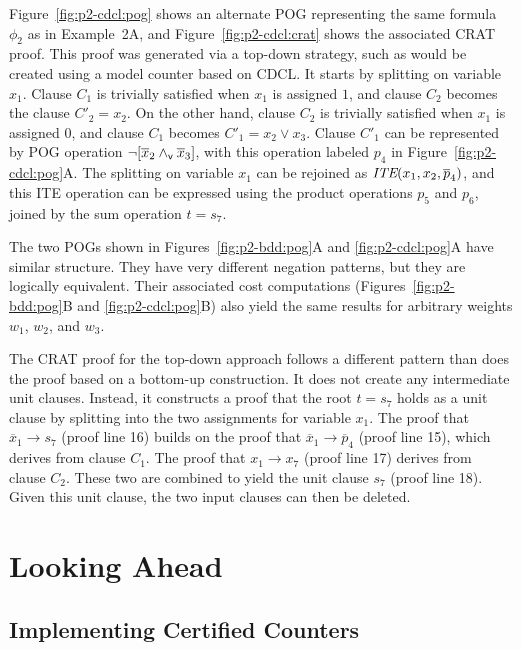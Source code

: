 \documentclass{llncs}
\newcommand{\pand}{\mathbin{\land_{\sf v}}}
\newcommand{\tautology}{1}
\newcommand{\nil}{0}
\newcommand{\obar}[1]{\overline{#1}}
\newcommand{\ite}{\mbox{\it ITE}}
\begin{document}
Figure~\ref{fig:p2-cdcl:pog} shows an alternate POG representing
the same formula $\phi_2$ as in Example~2A, and
Figure~\ref{fig:p2-cdcl:crat} shows the associated CRAT proof.  This
proof was generated via a top-down strategy, such as would be created
using a model counter based on CDCL\@.  It starts by splitting on
variable $x_1$.  Clause $C_1$ is trivially satisfied when $x_1$ is
assigned $\tautology$, and clause $C_2$ becomes the clause $C'_2 =
x_2$.  On the other hand, clause $C_2$ is trivially satisfied when
$x_1$ is assigned $\nil$, and clause $C_1$ becomes $C'_1 = x_2 \lor
x_3$.  Clause $C'_1$ can be represented by POG operation
$\neg[\obar{x}_2 \pand \obar{x}_3]$, with this operation labeled $p_4$
in Figure~\ref{fig:p2-cdcl:pog}A\@.  The splitting on variable
$x_1$ can be rejoined as $\ite(x_1, x_2, \obar{p}_4)$, and this ITE
operation can be expressed using the product operations $p_5$ and
$p_6$, joined by the sum operation $t = s_7$.

The two POGs shown in Figures~\ref{fig:p2-bdd:pog}A and
\ref{fig:p2-cdcl:pog}A have similar structure.  They have very
different negation patterns, but they are logically equivalent.  Their
associated cost computations (Figures~\ref{fig:p2-bdd:pog}B and
\ref{fig:p2-cdcl:pog}B) also yield the same results for arbitrary
weights $w_1$, $w_2$, and $w_3$.

The CRAT proof for the top-down approach follows a different pattern than does the proof based on a bottom-up construction.
It does
not create any intermediate unit clauses.  Instead, it constructs a proof
that the root $t = s_7$ holds as a unit clause by splitting into the
two assignments for variable $x_1$.  The proof that
$\obar{x}_1 \rightarrow s_7$ (proof line 16) builds on the proof that
$\obar{x}_1 \rightarrow \obar{p}_4$ (proof line 15), which derives from clause $C_1$.
The proof that $x_1 \rightarrow x_7$ (proof line 17) derives from clause $C_2$.
These two are combined to yield the unit clause $s_7$ (proof line 18).
Given this unit clause, the two input clauses can then be deleted.


\section{Looking Ahead}

\subsection{Implementing Certified Counters}
\end{document}
